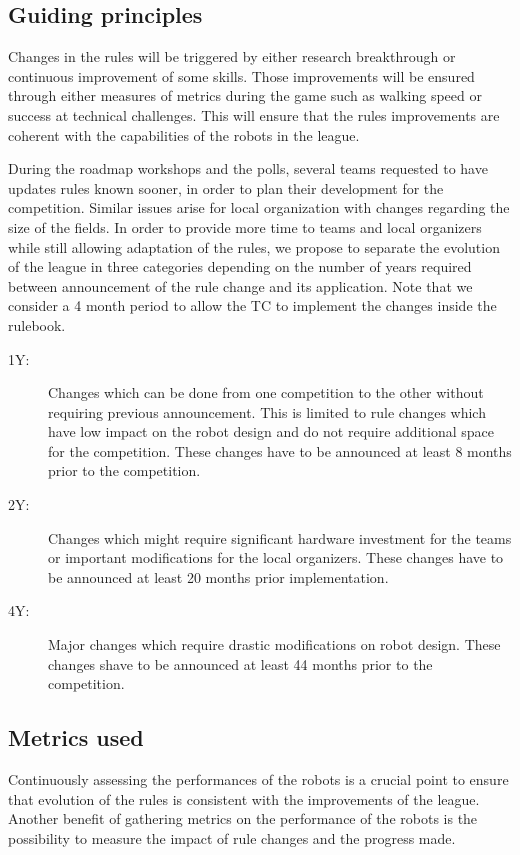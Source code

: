 \documentclass{article}
\begin{document}
\subsection{\label{sec:event-triggered-principles}Guiding principles}

Changes in the rules will be triggered by either research breakthrough or
continuous improvement of some skills. Those improvements will be ensured
through either measures of metrics during the game such as walking speed or
success at technical challenges. This will ensure that the rules improvements
are coherent with the capabilities of the robots in the league.

During the roadmap workshops and the polls, several teams requested to have
updates rules known sooner, in order to plan their development for the
competition. Similar issues arise for local organization with changes regarding
the size of the fields. In order to provide more time to teams and local
organizers while still allowing adaptation of the rules, we propose to separate
the evolution of the league in three categories depending on the number of years
required between announcement of the rule change and its application. Note that
we consider a 4 month period to allow the TC to implement the changes inside the
rulebook.
\begin{description}
\item[1Y:] Changes which can be done from one competition to the other without
  requiring previous announcement. This is limited to rule changes which have
  low impact on the robot design and do not require additional space for the
  competition. These changes have to be announced at least 8 months prior
  to the competition.
\item[2Y:] Changes which might require significant hardware investment for the
  teams or important modifications for the local organizers. These changes have
  to be announced at least 20 months prior implementation.
\item[4Y:] Major changes which require drastic modifications on robot design.
  These changes shave to be announced at least 44 months prior to the
  competition.
\end{description}

\subsection{\label{sec:metrics}Metrics used}
Continuously assessing the performances of the robots is a crucial point to
ensure that evolution of the rules is consistent with the improvements of the league.
Another benefit of gathering metrics on the performance of the robots is the possibility to
measure the impact of rule changes and the progress made.
\end{document}
